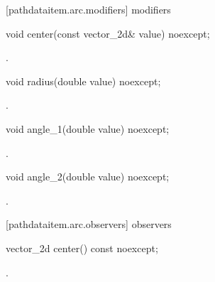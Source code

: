  [pathdataitem.arc.modifiers]{ modifiers}

\begin{itemdecl}
    void center(const vector_2d& value) noexcept;
\end{itemdecl}
\begin{itemdescr}
	\pnum
	\postconditions
	.
\end{itemdescr}

\begin{itemdecl}
    void radius(double value) noexcept;
\end{itemdecl}
\begin{itemdescr}
	\pnum
	\postconditions
	.
\end{itemdescr}

\begin{itemdecl}
    void angle_1(double value) noexcept;
\end{itemdecl}
\begin{itemdescr}
	\pnum
	\postconditions
	.
\end{itemdescr}

\begin{itemdecl}
    void angle_2(double value) noexcept;
\end{itemdecl}
\begin{itemdescr}
	\pnum
	\postconditions
	.
\end{itemdescr}

 [pathdataitem.arc.observers]{ observers}

\begin{itemdecl}
    vector_2d center() const noexcept;
\end{itemdecl}
\begin{itemdescr}
	\pnum
	\returns
	.
\end{itemdescr}

